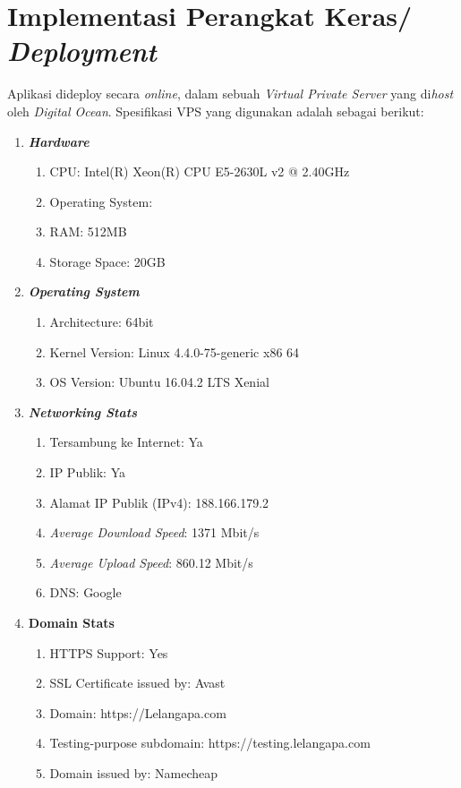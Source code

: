   \section{Implementasi Perangkat Keras/ \textit{Deployment}}
  
  Aplikasi dideploy secara \textit{online}, dalam sebuah \textit{Virtual Private Server} yang di\textit{host} oleh \textit{Digital Ocean}.
  Spesifikasi VPS yang digunakan adalah sebagai berikut:
  
  \begin{enumerate}
  	\item \textbf{\textit{Hardware}}
  	\begin{enumerate}
  		\item CPU: Intel(R) Xeon(R) CPU E5-2630L v2 @ 2.40GHz
  		\item Operating System: 
  		\item RAM: 512MB
  		\item Storage Space: 20GB
  	\end{enumerate}
  	
  	\item \textbf{\textit{Operating System}}
  	\begin{enumerate}
  		\item Architecture: 64bit
  		\item Kernel Version: Linux 4.4.0-75-generic x86 64
  		\item OS Version: Ubuntu 16.04.2 LTS Xenial
  	\end{enumerate}
  	
  	\item \textit{\textbf{Networking Stats}}
  	\begin{enumerate}
  		\item Tersambung ke Internet: Ya
  		\item IP Publik: Ya
  		\item Alamat IP Publik (IPv4): 188.166.179.2
  		\item \textit{Average Download Speed}: 1371 Mbit/s
  		\item \textit{Average Upload Speed}: 860.12 Mbit/s
  		\item DNS: Google
  	\end{enumerate}
  	
  	\item \textbf{\textbf{Domain Stats}}
  	\begin{enumerate}
  		\item HTTPS Support: Yes
  		\item SSL Certificate issued by: Avast
  		\item Domain: https://Lelangapa.com
  		\item Testing-purpose subdomain: https://testing.lelangapa.com
  		\item Domain issued by: Namecheap
  	\end{enumerate}
  	
  \end{enumerate}
  
